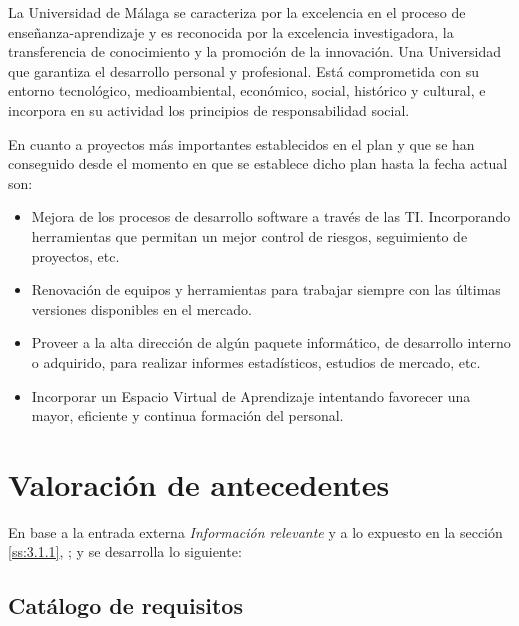 \documentclass[11pt,a4paper,spanish,twoside]{report}
\begin{document}
La Universidad de Málaga se caracteriza por la excelencia en el proceso de
enseñanza-aprendizaje y es reconocida por la excelencia investigadora, la
transferencia de conocimiento y la promoción de la innovación. Una
Universidad que garantiza el desarrollo personal y profesional. Está
comprometida con su entorno tecnológico, medioambiental, económico, social,
histórico y cultural, e incorpora en su actividad los principios de
responsabilidad social. 

En cuanto a proyectos más importantes establecidos en el plan y que se han
conseguido desde el momento en que se establece dicho plan hasta la fecha
actual son: 
\begin{itemize}
\item Mejora de los procesos de desarrollo software a través de las
  TI. Incorporando herramientas que permitan un mejor control de riesgos,
  seguimiento de proyectos, etc.  

\item Renovación de equipos y herramientas para trabajar siempre con las
  últimas versiones disponibles en el mercado.

\item Proveer a la alta dirección de algún paquete informático, de desarrollo
  interno o adquirido, para realizar informes estadísticos, estudios de
  mercado, etc. 

\item Incorporar un Espacio Virtual de Aprendizaje intentando favorecer
  una mayor, eficiente y continua formación del personal.  
\end{itemize}
        
\section{Valoración de antecedentes} 
En base a la entrada externa \emph{Información relevante} y a lo expuesto 
en la sección \vref{ss:3.1.1}, \emph{}; y
se desarrolla lo siguiente:

\subsection{Catálogo de requisitos} \label{ss:3.2.1}
\end{document}
